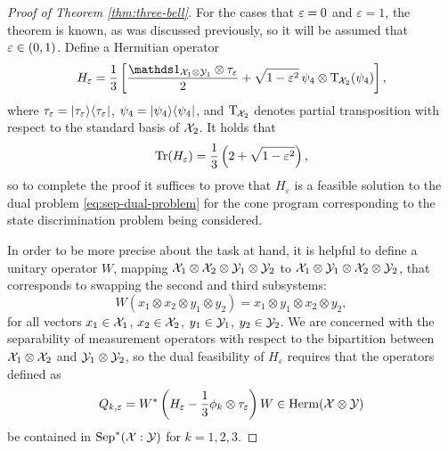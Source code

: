\begin{proof}[Proof of Theorem \ref{thm:three-bell}]
  For the cases that $\varepsilon = 0$ and $\varepsilon = 1$, the theorem is known,
  as was discussed previously, so it will be assumed that $\varepsilon \in (0,1)$.
  Define a Hermitian operator
  \begin{equation}
    H_{\eps} = \frac{1}{3}\left[\frac{\I_{\X_1\otimes\Y_1}\otimes
        \tau_{\eps}}{2} + \sqrt{1 - \eps^{2}} \, \psi_{4} \otimes
      \pt_{\negsmallspace\X_2}(\psi_{4}) \right],
  \end{equation}
  where $\tau_{\varepsilon} = \lvert\mspace{0.5mu} \tau_{\varepsilon} \mspace{0.5mu} \rangle\langle\mspace{0.5mu} \tau_{\varepsilon} \mspace{0.5mu} \rvert$,
  $\psi_{4} = \lvert\mspace{0.5mu} \psi_{4} \mspace{0.5mu} \rangle\langle\mspace{0.5mu} \psi_{4} \mspace{0.5mu} \rvert$,
  and $\operatorname{T}_{\mspace{-1.5mu}\mathcal{X}_2}$ denotes partial transposition with respect to
  the standard basis of $\mathcal{X}_2$.
  It holds that
  \begin{equation}
    \operatorname{Tr}(H_{\varepsilon}) = \frac{1}{3}\left(2 + \sqrt{1 - \varepsilon^{2}}\right),
  \end{equation}
  so to complete the proof it suffices to prove that $H_{\varepsilon}$ is a
  feasible solution to the dual problem \eqref{eq:sep-dual-problem}
  for the cone program corresponding to the state discrimination problem being considered.

  In order to be more precise about the task at hand, it is helpful to define a
  unitary operator $W$, mapping $\mathcal{X}_1\otimes\mathcal{X}_2\otimes\mathcal{Y}_1\otimes\mathcal{Y}_2$ to
  $\mathcal{X}_1\otimes\mathcal{Y}_1\otimes\mathcal{X}_2\otimes\mathcal{Y}_2$, that corresponds to swapping the
  second and third subsystems:
  \begin{equation}
    \label{eq:swap}
    W(x_{1}\otimes x_{2}\otimes y_{1}\otimes y_{2}) =
    x_{1}\otimes y_{1}\otimes x_{2}\otimes y_{2},
  \end{equation}
  for all vectors 
  $x_{1}\in\mathcal{X}_{1}$, $x_{2}\in\mathcal{X}_{2}$, $y_{1}\in\mathcal{Y}_{1}$, $y_{2}\in\mathcal{Y}_{2}$.
  We are concerned with the separability of measurement operators with respect
  to the bipartition between $\mathcal{X}_1\otimes\mathcal{X}_2$ and $\mathcal{Y}_1\otimes\mathcal{Y}_2$, so the
  dual feasibility of $H_{\varepsilon}$ requires that the operators defined as
  \begin{equation}
    Q_{k, \varepsilon} = W^{\ast} \left( H_{\varepsilon} - \frac{1}{3}\phi_{k} \otimes 
    \tau_{\varepsilon} \right) W \in \mathrm{Herm}(\mathcal{X}\otimes\mathcal{Y})
  \end{equation}
  be contained in $\mathrm{Sep}^{\ast}(\mathcal{X}:\mathcal{Y})$ for $k = 1,2,3$.


\end{proof}
